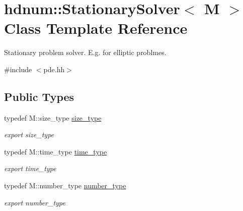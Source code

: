 \hypertarget{classhdnum_1_1StationarySolver}{
\section{hdnum::StationarySolver$<$ M $>$ Class Template Reference}
\label{classhdnum_1_1StationarySolver}
}


Stationary problem solver. E.g. for elliptic problmes.  




{\ttfamily \#include $<$pde.hh$>$}

\subsection*{Public Types}
\begin{DoxyCompactItemize}
\item 
\hypertarget{classhdnum_1_1StationarySolver_a95c041e1f3af75fd035bd94cb58184d8}{
typedef M::size\_\-type \hyperlink{classhdnum_1_1StationarySolver_a95c041e1f3af75fd035bd94cb58184d8}{size\_\-type}}
\label{classhdnum_1_1StationarySolver_a95c041e1f3af75fd035bd94cb58184d8}

\begin{DoxyCompactList}\small\item\em export size\_\-type \item\end{DoxyCompactList}\item 
\hypertarget{classhdnum_1_1StationarySolver_a54c185de5fd4ddd83991cf985e89f40b}{
typedef M::time\_\-type \hyperlink{classhdnum_1_1StationarySolver_a54c185de5fd4ddd83991cf985e89f40b}{time\_\-type}}
\label{classhdnum_1_1StationarySolver_a54c185de5fd4ddd83991cf985e89f40b}

\begin{DoxyCompactList}\small\item\em export time\_\-type \item\end{DoxyCompactList}\item 
\hypertarget{classhdnum_1_1StationarySolver_a48abc9e5fb531e68c63e5c72bdbb28a6}{
typedef M::number\_\-type \hyperlink{classhdnum_1_1StationarySolver_a48abc9e5fb531e68c63e5c72bdbb28a6}{number\_\-type}}
\label{classhdnum_1_1StationarySolver_a48abc9e5fb531e68c63e5c72bdbb28a6}

\begin{DoxyCompactList}\small\item\em export number\_\-type \item\end{DoxyCompactList}\end{DoxyCompactItemize}
